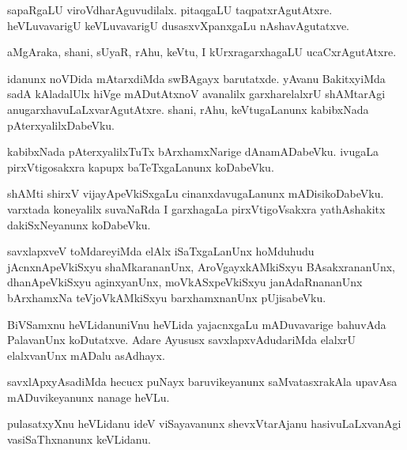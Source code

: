 \begin{mng}
sapaRgaLU viroVdharAguvudilalx. pitaqgaLU taqpatxrAgutAtxre. heVLuvavarigU keVLuvavarigU dusasxvXpanxgaLu nAshavAgutatxve.
\end{mng}

\begin{mng}
aMgAraka, shani, sUyaR, rAhu, keVtu, I kUrxragarxhagaLU ucaCxrAgutAtxre.
\end{mng}

\begin{mng}
idanunx noVDida mAtarxdiMda swBAgayx barutatxde. yAvanu BakitxyiMda sadA kAladalUlx hiVge mADutAtxnoV avanalilx garxharelalxrU shAMtarAgi anugarxhavuLaLxvarAgutAtxre. shani, rAhu, keVtugaLanunx kabibxNada pAterxyalilxDabeVku.
\end{mng}

\begin{mng}
kabibxNada pAterxyalilxTuTx bArxhamxNarige dAnamADabeVku. ivugaLa pirxVtigosakxra kapupx baTeTxgaLanunx koDabeVku.
\end{mng}

\begin{mng}
shAMti shirxV vijayApeVkiSxgaLu cinanxdavugaLanunx mADisikoDabeVku. varxtada koneyalilx suvaNaRda I garxhagaLa pirxVtigoVsakxra yathAshakitx dakiSxNeyanunx koDabeVku.
\end{mng}

\begin{mng}
savxlapxveV toMdareyiMda elAlx iSaTxgaLanUnx hoMduhudu jAcnxnApeVkiSxyu shaMkarananUnx, AroVgayxkAMkiSxyu BAsakxrananUnx, dhanApeVkiSxyu aginxyanUnx, moVkASxpeVkiSxyu janAdaRnananUnx bArxhamxNa teVjoVkAMkiSxyu barxhamxnanUnx pUjisabeVku.
\end{mng}

\begin{mng}
BiVSamxnu heVLidanu\mdash niVnu heVLida yajacnxgaLu mADuvavarige bahuvAda PalavanUnx koDutatxve. Adare Ayususx savxlapxvAdudariMda elalxrU elalxvanUnx mADalu asAdhayx.
\end{mng}

\begin{mng}
savxlApxyAsadiMda hecucx puNayx baruvikeyanunx saMvatasxrakAla upavAsa mADuvikeyanunx nanage heVLu.
\end{mng}

\begin{mng}
pulasatxyXnu heVLidanu \mdash ideV viSayavanunx shevxVtarAjanu hasivuLaLxvanAgi vasiSaThxnanunx keVLidanu.
\end{mng}

